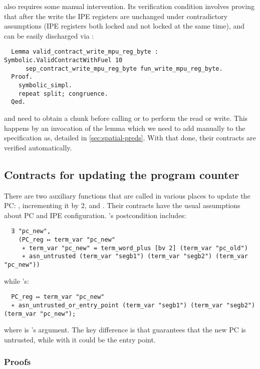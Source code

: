  also requires some manual intervention. Its verification condition involves proving that after the write the IPE registers are unchanged under contradictory assumptions (IPE registers both locked and not locked at the same time), and can be easily discharged via :
\begin{verbatim}
  Lemma valid_contract_write_mpu_reg_byte : Symbolic.ValidContractWithFuel 10
      sep_contract_write_mpu_reg_byte fun_write_mpu_reg_byte.
  Proof.
    symbolic_simpl.
    repeat split; congruence.
  Qed.
\end{verbatim}

 and  need to obtain a  chunk before calling  or  to perform the read or write. This happens by an invocation of the  lemma which we need to add manually to the \usail specification as, detailed in \cref{sec:spatial-preds}. With that done, their contracts are verified automatically.

\subsection{Contracts for updating the program counter}

There are two auxiliary functions that are called in various places to update the PC: , incrementing it by 2, and . Their contracts have the usual assumptions about PC and IPE configuration. 's postcondition includes:
\begin{verbatim}
  ∃ "pc_new",
    (PC_reg ↦ term_var "pc_new"
     ∗ term_var "pc_new" = term_word_plus [bv 2] (term_var "pc_old")
     ∗ asn_untrusted (term_var "segb1") (term_var "segb2") (term_var "pc_new"))
\end{verbatim}
while 's:
\begin{verbatim}
  PC_reg ↦ term_var "pc_new"
  ∗ asn_untrusted_or_entry_point (term_var "segb1") (term_var "segb2") (term_var "pc_new");
\end{verbatim}
where  is 's argument. The key difference is that  guarantees that the new PC is untrusted, while with  it could be the entry point.

\subsubsection{Proofs}

